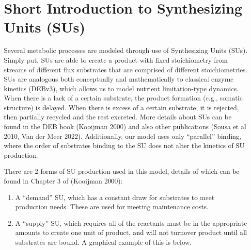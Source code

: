 \documentclass[
]{article}
\providecommand{\tightlist}{%
  \setlength{\itemsep}{0pt}\setlength{\parskip}{0pt}}
\begin{document}
\newpage

\section{Short Introduction to Synthesizing Units
(SUs)}\label{short-introduction-to-synthesizing-units-sus}

Several metabolic processes are modeled through use of Synthesizing
Units (SUs). Simply put, SUs are able to create a product with fixed
stoichiometry from streams of different flux substrates that are
comprised of different stoichiometries. SUs are analogous both
conceptually and mathematically to classical enzyme kinetics (DEBv3),
which allows us to model nutrient limitation-type dynamics. When there
is a lack of a certain substrate, the product formation (e.g., somatic
structure) is delayed. When there is excess of a certain substrate, it
is rejected, then partially recycled and the rest excreted. More details
about SUs can be found in the DEB book (Kooijman 2000) and also other
publications (Sousa et al 2010, Van der Meer 2022). Additionally, our
model uses only ``parallel'' binding, where the order of substrates
binding to the SU does not alter the kinetics of SU production.

There are 2 forms of SU production used in this model, details of which
can be found in Chapter 3 of (Kooijman 2000):

\begin{enumerate}
\def\labelenumi{\arabic{enumi}.}
\tightlist
\item
  A ``demand'' SU, which has a constant draw for substrates to meet
  production needs. These are used for meeting maintenance costs.
\item
  A ``supply'' SU, which requires all of the reactants must be in the
  appropriate amounts to create one unit of product, and will not
  turnover product until all substrates are bound. A graphical example
  of this is below.
\end{enumerate}
\end{document}
